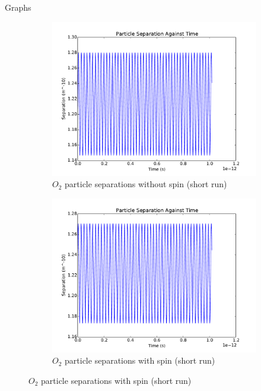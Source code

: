 \documentclass[12pt]{article}
\begin{document}
\pagebreak
\centering
	Graphs
	\begin{figure}[H]
		\centering
		\begin{subfigure}{0.45\textwidth}
			\includegraphics[width=\textwidth]{oxnospinshort}
			\caption*{$O_2$ particle separations without spin (short run)}
		\end{subfigure}
		\begin{subfigure}{0.45\textwidth}
			\includegraphics[width=\textwidth]{oxspinshort}
			\caption*{$O_2$ particle separations with spin (short run)}
		\end{subfigure}
	\end{figure}
	
\end{document}
